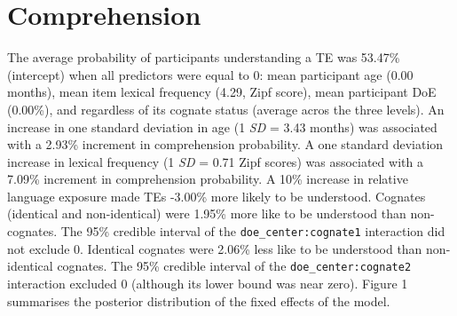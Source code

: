 \documentclass[
  english,
  man,man,floatsintext]{apa6}
\begin{document}
\hypertarget{comprehension}{%
\section{Comprehension}\label{comprehension}}

The average probability of participants understanding a TE was 53.47\% (intercept) when all predictors were equal to 0: mean participant age (0.00 months), mean item lexical frequency (4.29, Zipf score), mean participant DoE (0.00\%), and regardless of its cognate status (average acros the three levels). An increase in one standard deviation in age (1 \emph{SD} = 3.43 months) was associated with a 2.93\% increment in comprehension probability. A one standard deviation increase in lexical frequency (1 \emph{SD} = 0.71 Zipf scores) was associated with a 7.09\% increment in comprehension probability. A 10\% increase in relative language exposure made TEs -3.00\% more likely to be understood. Cognates (identical and non-identical) were 1.95\% more like to be understood than non-cognates. The 95\% credible interval of the \texttt{doe\_center:cognate1} interaction did not exclude 0. Identical cognates were 2.06\% less like to be understood than non-identical cognates. The 95\% credible interval of the \texttt{doe\_center:cognate2} interaction excluded 0 (although its lower bound was near zero). Figure 1 summarises the posterior distribution of the fixed effects of the model.
\end{document}
